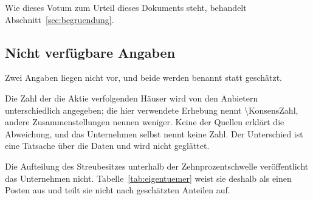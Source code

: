 Wie dieses Votum zum Urteil dieses Dokuments steht, behandelt
Abschnitt~\ref{sec:begruendung}.

\subsection{Nicht verf\"ugbare Angaben}
\label{sec:luecken}

Zwei Angaben liegen nicht vor, und beide werden benannt statt gesch\"atzt.

Die Zahl der die Aktie verfolgenden H\"auser wird von den Anbietern
unterschiedlich angegeben; die hier verwendete Erhebung nennt
\num{\KonsensZahl}, andere Zusammenstellungen nennen weniger. Keine der
Quellen erkl\"art die Abweichung, und das Unternehmen selbst nennt keine
Zahl. Der Unterschied ist eine Tatsache \"uber die Daten und wird nicht
gegl\"attet.

Die Aufteilung des Streubesitzes unterhalb der Zehnprozentschwelle
ver\"offentlicht das Unternehmen nicht. Tabelle~\ref{tab:eigentuemer} weist
sie deshalb als einen Posten aus und teilt sie nicht nach gesch\"atzten
Anteilen auf.
